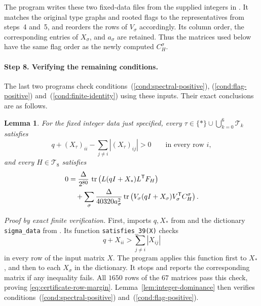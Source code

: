 \documentclass[11pt]{article}
\newcommand{\tr}{\operatorname{tr}}
\newtheorem{lemma}{Lemma}
\begin{document}
The program \href{https://github.com/Diudiutse/triangle-free-signless-laplacian/blob/main/programs/prepare_readable_data.py}{} writes these two fixed-data
files from the supplied integers in
\href{https://github.com/Diudiutse/triangle-free-signless-laplacian/blob/main/arxiv/anc/filtered-sharp-exact-certificate.json}{}.
It matches the original type graphs and rooted flags to the representatives
from steps~4 and~5, and reorders the rows of $V_\sigma$ accordingly.
Its column order, the corresponding entries of $X_\sigma$, and $a_\sigma$
are retained.
Thus the matrices used below have the same flag order as the newly
computed $C_H^\sigma$.

\paragraph{Step 8. Verifying the remaining conditions.}
The last two programs check conditions~(\ref{cond:spectral-positive}),
(\ref{cond:flag-positive}) and~(\ref{cond:finite-identity}) using these inputs.
Their exact conclusions are as follows.
\begin{lemma}\label{lem:finite-certificate}
For the fixed integer data just specified, every
$\tau\in\{*\}\cup\bigcup_{k=0}^6\mathcal T_k$ satisfies
\begin{equation}\label{eq:certificate-row-margin}
q+(X_\tau)_{ii}-\sum_{j\ne i}|(X_\tau)_{ij}|>0
\qquad\text{in every row }i,
\end{equation}
and every $H\in\mathcal T_8$ satisfies
\begin{align}
0&=\frac{\Delta}{2^{80}}\,
\tr\left(L(qI+X_*)L^{\mathsf T}F_H\right)\notag\\
&\quad+\sum_\sigma\frac{\Delta}{40320a_\sigma^2}
\tr\left(V_\sigma(qI+X_\sigma)V_\sigma^{\mathsf T}C_H^\sigma\right).
\label{eq:integer-certificate}
\end{align}
\end{lemma}
\noindent\emph{Proof by exact finite verification.}
First, \href{https://github.com/Diudiutse/triangle-free-signless-laplacian/blob/main/programs/verify_39.py}{} imports $q,X_*$ from \href{https://github.com/Diudiutse/triangle-free-signless-laplacian/blob/main/programs/spectral_data.py}{}
and the dictionary \texttt{sigma\_data} from \href{https://github.com/Diudiutse/triangle-free-signless-laplacian/blob/main/programs/sigma_data.py}{}.
Its function \texttt{satisfies\_39(X)} checks
\[
q+X_{ii}>\sum_{j\ne i}|X_{ij}|
\]
in every row of the input matrix $X$.
The program applies this function first to $X_*$, and then to each
$X_\sigma$ in the dictionary.
It stops and reports the corresponding matrix if any inequality fails.
All $1650$ rows of the $67$ matrices pass this check, proving
\eqref{eq:certificate-row-margin}.
Lemma~\ref{lem:integer-dominance} then verifies
conditions~(\ref{cond:spectral-positive}) and~(\ref{cond:flag-positive}).
\end{document}
